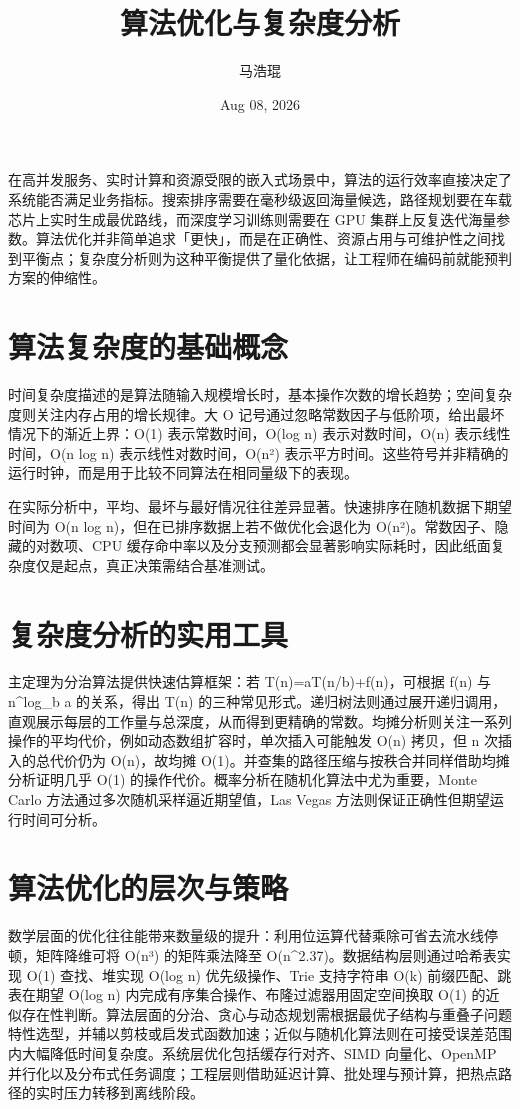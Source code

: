 \title{算法优化与复杂度分析}
\author{马浩琨}
\date{Aug 08, 2026}
\maketitle
在高并发服务、实时计算和资源受限的嵌入式场景中，算法的运行效率直接决定了系统能否满足业务指标。搜索排序需要在毫秒级返回海量候选，路径规划要在车载芯片上实时生成最优路线，而深度学习训练则需要在 GPU 集群上反复迭代海量参数。算法优化并非简单追求「更快」，而是在正确性、资源占用与可维护性之间找到平衡点；复杂度分析则为这种平衡提供了量化依据，让工程师在编码前就能预判方案的伸缩性。\par
\chapter{算法复杂度的基础概念}
时间复杂度描述的是算法随输入规模增长时，基本操作次数的增长趋势；空间复杂度则关注内存占用的增长规律。大 O 记号通过忽略常数因子与低阶项，给出最坏情况下的渐近上界：O(1) 表示常数时间，O(log n) 表示对数时间，O(n) 表示线性时间，O(n log n) 表示线性对数时间，O(n²) 表示平方时间。这些符号并非精确的运行时钟，而是用于比较不同算法在相同量级下的表现。\par
在实际分析中，平均、最坏与最好情况往往差异显著。快速排序在随机数据下期望时间为 O(n log n)，但在已排序数据上若不做优化会退化为 O(n²)。常数因子、隐藏的对数项、CPU 缓存命中率以及分支预测都会显著影响实际耗时，因此纸面复杂度仅是起点，真正决策需结合基准测试。\par
\chapter{复杂度分析的实用工具}
主定理为分治算法提供快速估算框架：若 T(n)=aT(n/b)+f(n)，可根据 f(n) 与 n\^{}log\_{}b a 的关系，得出 T(n) 的三种常见形式。递归树法则通过展开递归调用，直观展示每层的工作量与总深度，从而得到更精确的常数。均摊分析则关注一系列操作的平均代价，例如动态数组扩容时，单次插入可能触发 O(n) 拷贝，但 n 次插入的总代价仍为 O(n)，故均摊 O(1)。并查集的路径压缩与按秩合并同样借助均摊分析证明几乎 O(1) 的操作代价。概率分析在随机化算法中尤为重要，Monte Carlo 方法通过多次随机采样逼近期望值，Las Vegas 方法则保证正确性但期望运行时间可分析。\par
\chapter{算法优化的层次与策略}
数学层面的优化往往能带来数量级的提升：利用位运算代替乘除可省去流水线停顿，矩阵降维可将 O(n³) 的矩阵乘法降至 O(n\^{}2.37)。数据结构层则通过哈希表实现 O(1) 查找、堆实现 O(log n) 优先级操作、Trie 支持字符串 O(k) 前缀匹配、跳表在期望 O(log n) 内完成有序集合操作、布隆过滤器用固定空间换取 O(1) 的近似存在性判断。算法层面的分治、贪心与动态规划需根据最优子结构与重叠子问题特性选型，并辅以剪枝或启发式函数加速；近似与随机化算法则在可接受误差范围内大幅降低时间复杂度。系统层优化包括缓存行对齐、SIMD 向量化、OpenMP 并行化以及分布式任务调度；工程层则借助延迟计算、批处理与预计算，把热点路径的实时压力转移到离线阶段。\par
